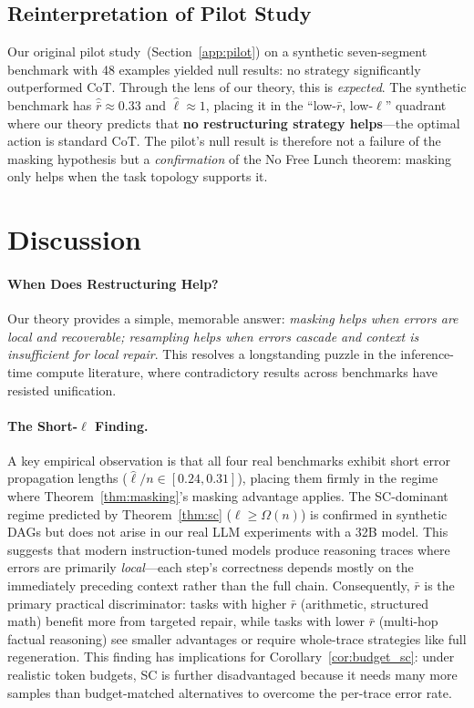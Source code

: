 \documentclass{article}
\begin{document}
\subsection{Reinterpretation of Pilot Study}

Our original pilot study~(Section~\ref{app:pilot}) on a synthetic seven-segment benchmark with 48 examples yielded null results: no strategy significantly outperformed CoT. Through the lens of our theory, this is \emph{expected}. The synthetic benchmark has $\hat{\bar{r}} \approx 0.33$ and $\hat{\ell} \approx 1$, placing it in the ``low-$\bar{r}$, low-$\ell$'' quadrant where our theory predicts that \textbf{no restructuring strategy helps}---the optimal action is standard CoT. The pilot's null result is therefore not a failure of the masking hypothesis but a \emph{confirmation} of the No Free Lunch theorem: masking only helps when the task topology supports it.

\section{Discussion}
\label{sec:discussion}

\paragraph{When Does Restructuring Help?} Our theory provides a simple, memorable answer: \emph{masking helps when errors are local and recoverable; resampling helps when errors cascade and context is insufficient for local repair}. This resolves a longstanding puzzle in the inference-time compute literature, where contradictory results across benchmarks have resisted unification.

\paragraph{The Short-$\ell$ Finding.} A key empirical observation is that all four real benchmarks exhibit short error propagation lengths ($\hat{\ell}/n \in [0.24, 0.31]$), placing them firmly in the regime where Theorem~\ref{thm:masking}'s masking advantage applies. The SC-dominant regime predicted by Theorem~\ref{thm:sc} ($\ell \geq \Omega(n)$) is confirmed in synthetic DAGs but does not arise in our real LLM experiments with a 32B model. This suggests that modern instruction-tuned models produce reasoning traces where errors are primarily \emph{local}---each step's correctness depends mostly on the immediately preceding context rather than the full chain. Consequently, $\bar{r}$ is the primary practical discriminator: tasks with higher $\bar{r}$ (arithmetic, structured math) benefit more from targeted repair, while tasks with lower $\bar{r}$ (multi-hop factual reasoning) see smaller advantages or require whole-trace strategies like full regeneration. This finding has implications for Corollary~\ref{cor:budget_sc}: under realistic token budgets, SC is further disadvantaged because it needs many more samples than budget-matched alternatives to overcome the per-trace error rate.
\end{document}
